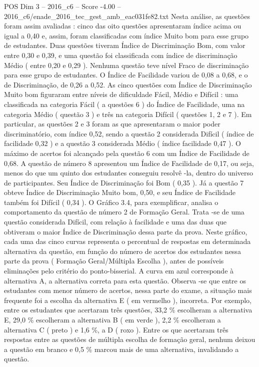 \begin{textsample}{POS Dim 3 – 2016\_c6 – Score -4.00 – 2016\_c6/enade\_2016\_tec\_gest\_amb\_eac031fe82.txt}
Nesta análise, as questões foram assim avaliadas : cinco das oito questões apresentaram índice acima ou igual a 0,40 e, assim, foram classificadas com índice Muito bom para esse grupo de estudantes.
Duas questões tiveram Índice de Discriminação Bom, com valor entre 0,30 e 0,39, e uma questão foi classificada com índice de discriminação Médio ( entre 0,20 e 0,29 ).
Nenhuma questão teve nível Fraco de discriminação para esse grupo de estudantes.
O Índice de Facilidade variou de 0,08 a 0,68, e o de Discriminação, de 0,26 a 0,52.
As cinco questões com Índice de Discriminação Muito bom figuraram entre níveis de dificuldade Fácil, Médio e Difícil : uma classificada na categoria Fácil ( a questões 6 ) do Índice de Facilidade, uma na categoria Médio ( questão 3 ) e três na categoria Difícil ( questões 1, 2 e 7 ).
Em particular, as questões 2 e 3 foram as que apresentaram o maior poder discriminatório, com índice 0,52, sendo a questão 2 considerada Difícil ( índice de facilidade 0,32 ) e a questão 3 considerada Médio ( índice facilidade 0,47 ).
O máximo de acertos foi alcançado pela questão 6 com um Índice de Facilidade de 0,68.
A questão de número 8 apresentou um Índice de Facilidade de 0,17, ou seja, menos do que um quinto dos estudantes conseguiu resolvê -la, dentro do universo de participantes.
Seu Índice de Discriminação foi Bom ( 0,35 ).
Já a questão 7 obteve Índice de Discriminação Muito bom, 0,50, e seu Índice de Facilidade também foi Difícil ( 0,34 ).
O Gráfico 3.4, para exemplificar, analisa o comportamento da questão de número 2 de Formação Geral.
Trata -se de uma questão considerada Difícil, com relação à facilidade e uma das duas que obtiveram o maior Índice de Discriminação dessa parte da prova.
Neste gráfico, cada uma das cinco curvas representa o percentual de respostas em determinada alternativa da questão, em função do número de acertos dos estudantes nessa parte da prova ( Formação Geral/Múltipla Escolha ), antes de possíveis eliminações pelo critério do ponto-bisserial.
A curva em azul corresponde à alternativa A, a alternativa correta para esta questão.
Observa -se que entre os estudantes com menor número de acertos, nessa parte do exame, a situação mais frequente foi a escolha da alternativa E ( em vermelho ), incorreta.
Por exemplo, entre os estudantes que acertaram três questões, 33,2 \% escolheram a alternativa E, 29,0 \% escolheram a alternativa B ( em verde ), 2,2 \% escolheram a alternativa C ( preto ) e 1,6 \%, a D ( roxo ).
Entre os que acertaram três respostas entre as questões de múltipla escolha de formação geral, nenhum deixou a questão em branco e 0,5 \% marcou mais de uma alternativa, invalidando a questão.

\end{textsample}
